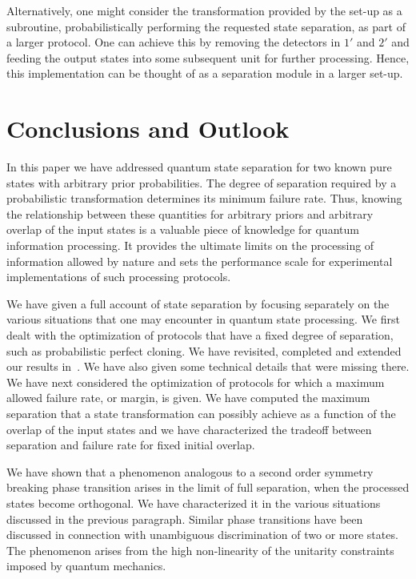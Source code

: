 \documentclass[aps,pra,twocolumn,showpacs]{revtex4-1}
\begin{document}
{Alternatively, one might consider the transformation provided by the set-up as a subroutine, probabilistically performing the requested state separation, as part of a larger protocol. One can achieve this by removing the detectors in $1'$ and $2'$ and feeding the output states into some subsequent unit for further processing. Hence, this implementation can be thought of as a separation module in a larger set-up.

\vspace{2em}

\section{Conclusions and Outlook}\label{conclusion}

In this paper we have addressed quantum state separation for two known pure states with arbitrary prior probabilities. The degree of separation required by a probabilistic transformation determines its minimum failure rate. Thus, knowing the relationship between these quantities  for arbitrary priors and arbitrary overlap of the input states is a valuable piece of knowledge  for quantum information processing. It provides the ultimate limits on the processing of information allowed by nature and sets the performance scale for experimental implementations of such processing protocols. 

We have given a full account of state separation by focusing separately  on the various situations that one may encounter in quantum state processing. We first dealt with the optimization of protocols that have a fixed degree of separation, such as probabilistic perfect cloning. We  have revisited, completed and extended our results in~\cite{us1}. We have also given some technical details that were missing there. We have next considered the optimization of protocols for which a maximum allowed failure rate, or margin, is given. We have computed the maximum separation that a state transformation can possibly achieve as a function of the overlap of the input states and we have characterized the tradeoff between separation and failure rate for fixed initial overlap.

We have shown that a phenomenon analogous to a second order symmetry breaking phase transition arises in the limit of full separation, when the processed states become orthogonal. We have characterized it in the various situations discussed in the previous paragraph. Similar phase transitions have been discussed in connection with unambiguous discrimination of two or more states. The phenomenon arises from the high non-linearity of the unitarity constraints imposed by quantum mechanics.  

}
\end{document}
